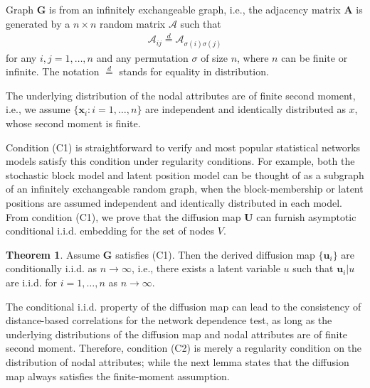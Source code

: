\documentclass[12pt]{article}
\theoremstyle{definition}
\newtheorem{theorem}{Theorem}
\begin{document}
	\begin{description}[align=left]
		\item [(C1)] Graph $\mathbf{G}$ is from an infinitely exchangeable graph, i.e., the adjacency matrix $\mathbf{A}$ is generated by a $n \times n$ random matrix $\mathcal{A}$ such that 
		\begin{align*}
			\mathcal{A}_{ij} \stackrel{d}{=} \mathcal{A}_{\sigma(i) \sigma(j)}
		\end{align*}
		for any $i,j=1,\ldots,n$ and any permutation $\sigma$ of size $n$, where $n$ can be finite or infinite. The notation $\stackrel{d}{=}$ stands for equality in distribution. 
		
		\item [(C2)] The underlying distribution of the nodal attributes are of finite second moment, i.e., we assume $\{\mathbf{x}_{i} : i=1,\ldots,n\}$ are independent and identically distributed as $x$, whose second moment is finite.
	\end{description}
	
	Condition (C1) is straightforward to verify and most popular statistical networks models satisfy this condition under regularity conditions. For example, both the stochastic block model and latent position model can be thought of as a subgraph of an infinitely exchangeable random graph, when the block-membership or latent positions are assumed independent and identically distributed in each model. From condition (C1), we prove that the diffusion map $\mathbf{U}$ can furnish asymptotic conditional i.i.d. embedding for the set of nodes $V$. 
	
	\begin{theorem}
		\label{main_lemma}
		Assume $\mathbf{G}$ satisfies (C1). Then the derived diffusion map $\{ \mathbf{u}_{i}\}$ are conditionally i.i.d. as $n \rightarrow \infty$,  i.e., there exists a latent variable $u$ such that $\mathbf{u}_{i}|u$ are i.i.d. for $i=1,\ldots,n$ as $n \rightarrow \infty$.  
	\end{theorem} 
	
	The conditional i.i.d. property of the diffusion map can lead to the consistency of distance-based correlations for the network dependence test, as long as the underlying distributions of the diffusion map and nodal attributes are of finite second moment. Therefore, condition (C2) is merely a regularity condition on the distribution of nodal attributes; while the next lemma states that the diffusion map always satisfies the finite-moment assumption.
	
\end{document}
